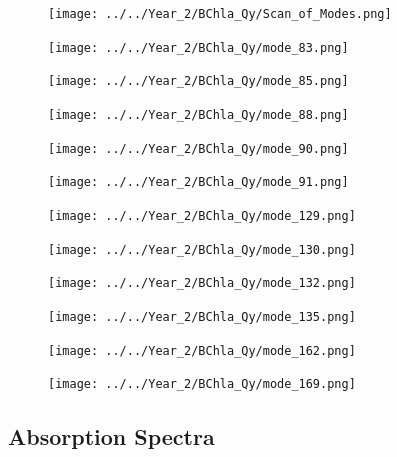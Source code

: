 \begin{figure}
    \texttt{[image: ../../Year\_2/BChla\_Qy/Scan\_of\_Modes.png]}
\end{figure}

\begin{figure}
    \texttt{[image: ../../Year\_2/BChla\_Qy/mode\_83.png]}
\end{figure}
\begin{figure}
    \texttt{[image: ../../Year\_2/BChla\_Qy/mode\_85.png]}
\end{figure}
\begin{figure}
    \texttt{[image: ../../Year\_2/BChla\_Qy/mode\_88.png]}
\end{figure}
\begin{figure}
    \texttt{[image: ../../Year\_2/BChla\_Qy/mode\_90.png]}
\end{figure}
\begin{figure}
    \texttt{[image: ../../Year\_2/BChla\_Qy/mode\_91.png]}
\end{figure}
\begin{figure}
    \texttt{[image: ../../Year\_2/BChla\_Qy/mode\_129.png]}
\end{figure}
\begin{figure}
    \texttt{[image: ../../Year\_2/BChla\_Qy/mode\_130.png]}
\end{figure}
\begin{figure}
    \texttt{[image: ../../Year\_2/BChla\_Qy/mode\_132.png]}
\end{figure}
\begin{figure}
    \texttt{[image: ../../Year\_2/BChla\_Qy/mode\_135.png]}
\end{figure}
\begin{figure}
    \texttt{[image: ../../Year\_2/BChla\_Qy/mode\_162.png]}
\end{figure}
\begin{figure}
    \texttt{[image: ../../Year\_2/BChla\_Qy/mode\_169.png]}
\end{figure}

\subsection{Absorption Spectra}
\label{subsec:absorption_spectra}



